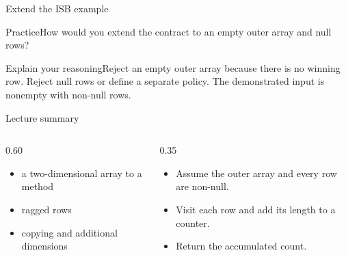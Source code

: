 \documentclass[10pt,aspectratio=169]{beamer}
\begin{document}
\begin{frame}[fragile,t]{Extend the ISB example}
\begin{alertblock}{Practice}How would you extend the contract to an empty outer array and null rows?\end{alertblock}\vspace{3mm}\begin{exampleblock}{Explain your reasoning}Reject an empty outer array because there is no winning row. Reject null rows or define a separate policy. The demonstrated input is nonempty with non{-}null rows.\end{exampleblock}
\end{frame}
\begin{frame}[fragile,t]{Lecture summary}
\begin{columns}[T,onlytextwidth]\begin{column}{0.60\textwidth}
\begin{itemize}
\item a two-dimensional array to a method
\item ragged rows
\item copying and additional dimensions
\end{itemize}
\end{column}\begin{column}{0.35\textwidth}\small
\begin{itemize}
\item Assume the outer array and every row are non-null.
\item Visit each row and add its length to a counter.
\item Return the accumulated count.
\end{itemize}
\end{column}\end{columns}
\end{frame}
\end{document}
